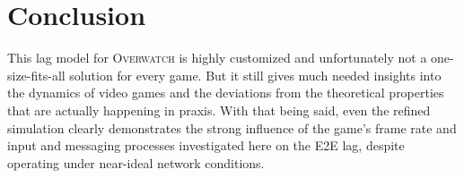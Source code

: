 \section{Conclusion}
\label{sec:conclusion}

This lag model for \textsc{Overwatch} is highly customized and unfortunately not a one-size-fits-all solution for every game. But it still gives much needed insights into the dynamics of video games and the deviations from the theoretical properties that are actually happening in praxis. With that being said, even the refined simulation clearly demonstrates the strong influence of the game's frame rate and input and messaging processes investigated here on the \gls{E2E} lag, despite operating under near-ideal network conditions.